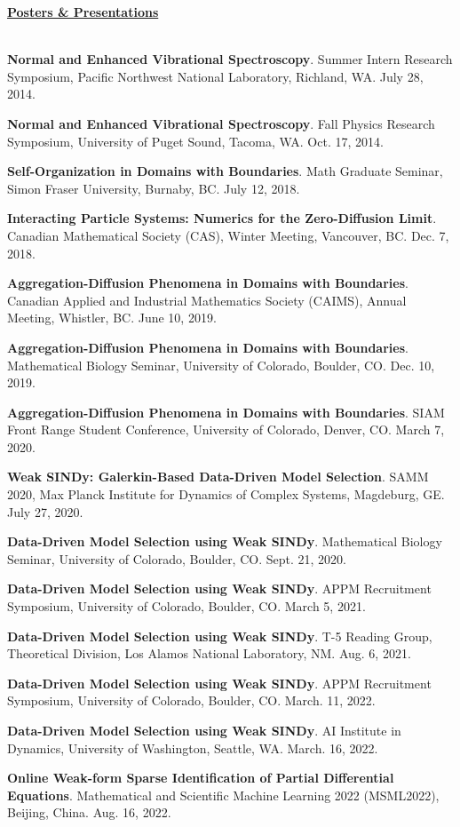 \documentclass[letterpaper,11pt,oneside]{article}
\newcommand{\headr}[1]{\vspace{10pt}\uline{\Large{\textbf{#1}} \hfill } \\ \vspace{-10pt}\\}
\begin{document}

%

\headr{Posters \& Presentations}

\begin{enumerate}[label={[\arabic*]}]
\item \textbf{Normal and Enhanced Vibrational Spectroscopy}. Summer Intern Research Symposium, Pacific Northwest National Laboratory, Richland, WA. July 28, 2014.
\item \textbf{Normal and Enhanced Vibrational Spectroscopy}. Fall Physics Research Symposium, University of Puget Sound, Tacoma, WA. Oct. 17, 2014.
\item \textbf{Self-Organization in Domains with Boundaries}. Math Graduate Seminar, Simon Fraser University, Burnaby, BC. July 12, 2018.
\item \textbf{Interacting Particle Systems: Numerics for the Zero-Diffusion Limit}. Canadian Mathematical Society (CAS), Winter Meeting, Vancouver, BC. Dec. 7, 2018.
\item \textbf{Aggregation-Diffusion Phenomena in Domains with Boundaries}. Canadian Applied and Industrial Mathematics Society (CAIMS), Annual Meeting, Whistler, BC. June 10, 2019.
\item \textbf{Aggregation-Diffusion Phenomena in Domains with Boundaries}. Mathematical Biology Seminar, University of Colorado, Boulder, CO. Dec. 10, 2019.
\item \textbf{Aggregation-Diffusion Phenomena in Domains with Boundaries}. SIAM Front Range Student Conference, University of Colorado, Denver, CO. March 7, 2020.
\item \textbf{Weak SINDy: Galerkin-Based Data-Driven Model Selection}. SAMM 2020, Max Planck Institute for Dynamics of Complex Systems, Magdeburg, GE. July 27, 2020.
\item \textbf{Data-Driven Model Selection using Weak SINDy}. Mathematical Biology Seminar, University of Colorado, Boulder, CO. Sept. 21, 2020.
\item \textbf{Data-Driven Model Selection using Weak SINDy}. APPM Recruitment Symposium, University of Colorado, Boulder, CO. March 5, 2021.
\item \textbf{Data-Driven Model Selection using Weak SINDy}. T-5 Reading Group, Theoretical Division, Los Alamos National Laboratory, NM. Aug. 6, 2021.
\item \textbf{Data-Driven Model Selection using Weak SINDy}. APPM Recruitment Symposium, University of Colorado, Boulder, CO. March. 11, 2022.
\item \textbf{Data-Driven Model Selection using Weak SINDy}. AI Institute in Dynamics, University of Washington, Seattle, WA. March. 16, 2022.
\item \textbf{Online Weak-form Sparse Identification of Partial Differential Equations}. Mathematical and Scientific Machine Learning 2022 (MSML2022), Beijing, China. Aug. 16, 2022.
\end{enumerate}
\end{document}
